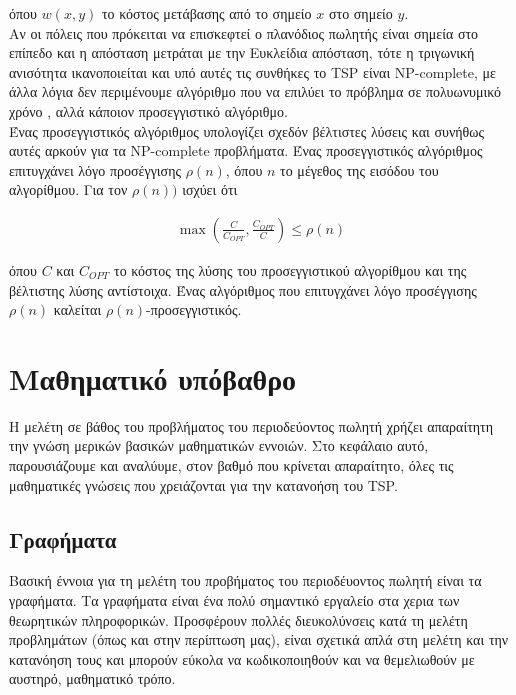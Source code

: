 \documentclass[oneside,12pt]{book}
\theoremstyle{definition}
\begin{document}
όπου \(w(x,y)\) το κόστος μετάβασης από το σημείο \(x\) στο σημείο \(y\). \\

Αν οι πόλεις που πρόκειται να επισκεφτεί ο πλανόδιος πωλητής είναι σημεία στο επίπεδο και η απόσταση μετράται με την Ευκλείδια απόσταση, τότε η τριγωνική ανισότητα ικανοποιείται και υπό αυτές τις συνθήκες το TSP είναι NP-complete, με άλλα λόγια δεν περιμένουμε αλγόριθμο που να επιλύει το πρόβλημα σε πολυωνυμικό χρόνο , αλλά κάποιον προσεγγιστικό αλγόριθμο. \\

Ένας προσεγγιστικός αλγόριθμος υπολογίζει σχεδόν βέλτιστες λύσεις και συνήθως αυτές αρκούν για τα NP-complete προβλήματα. Ένας προσεγγιστικός αλγόριθμος επιτυγχάνει λόγο προσέγγισης \(ρ(n)\), όπου \(n\) το μέγεθος της εισόδου του αλγορίθμου. Για τον \(ρ(n))\) ισχύει ότι

\begin{align*}
	\max\left(\frac{C}{C_{OPT}}, \frac{C_{OPT}}{C}\right) \leq ρ(n)
\end{align*}  

όπου \(C\) και \(C_{OPT}\) το κόστος της λύσης του προσεγγιστικού αλγορίθμου και της βέλτιστης λύσης αντίστοιχα. Ένας αλγόριθμος που επιτυγχάνει λόγο προσέγγισης \(ρ(n)\) καλείται \(ρ(n)\)-προσεγγιστικός. \\

\chapter{Μαθηματικό υπόβαθρο}

Η μελέτη σε βάθος του προβλήματος του περιοδεύοντος πωλητή χρήζει απαραίτητη την γνώση μερικών βασικών μαθηματικών εννοιών. Στο κεφάλαιο αυτό, παρουσιάζουμε και αναλύυμε, στον βαθμό που κρίνεται απαραίτητο, όλες τις μαθηματικές γνώσεις που χρειάζονται για την κατανοήση του TSP. \\

\section{Γραφήματα}

Βασική έννοια για τη μελέτη του προβήματος του περιοδέυοντος πωλητή είναι τα γραφήματα. Τα γραφήματα είναι ένα πολύ σημαντικό εργαλείο στα χερια των θεωρητικών πληροφορικών. Προσφέρουν πολλές διευκολύνσεις κατά τη μελέτη προβλημάτων (όπως και στην περίπτωση μας), είναι σχετικά απλά στη μελέτη και την κατανόηση τους και μπορούν εύκολα να κωδικοποιηθούν και να θεμελιωθούν με αυστηρό, μαθηματικό τρόπο. \\
\end{document}
